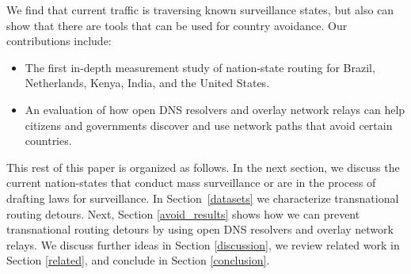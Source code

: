 We find that current traffic is traversing known surveillance states, but also
can show that there are tools that can be used for country avoidance. Our contributions 
include: 

\begin{itemize}
\item The first in-depth measurement study of
  nation-state routing for Brazil, Netherlands, Kenya, India, and the
  United States. 
\item An evaluation of how open DNS resolvers and overlay
  network relays can help citizens and governments discover and use
  network paths that avoid certain countries.
\end{itemize}
\noindent

This rest of this paper is organized as follows.  In the next section, we discuss
the current nation-states that conduct mass surveillance or are in the 
process of drafting laws for surveillance.  In
Section~\ref{datasets} we characterize transnational routing detours. Next, Section
\ref{avoid_results} shows how we can prevent transnational routing detours by using open DNS resolvers
and overlay network relays.  We discuss further ideas in Section
\ref{discussion}, we review related work in Section \ref{related}, and
conclude in Section \ref{conclusion}. 
